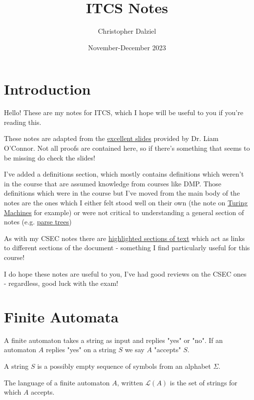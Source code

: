 \documentclass{article}
\title{ITCS Notes}
\author{Christopher Dalziel}
\date{November-December 2023}
\begin{document}
\maketitle

\tableofcontents\label{table-of-contents}

\newpage

\section{Introduction}
Hello! These are my notes for ITCS, which I hope will be useful to you if you're reading this.

These notes are adapted from the \href{https://www.inf.ed.ac.uk/teaching/courses/itcs/lectures.html}{excellent slides} provided by Dr. Liam O'Connor. Not all proofs are contained here, so if there's something that seems to be missing do check the slides!

I've added a definitions section, which mostly contains definitions which weren't in the course that are assumed knowledge from courses like DMP. Those definitions which were in the course but I've moved from the main body of the notes are the ones which I either felt stood well on their own (the note on \hyperref[tm]{Turing Machines} for example) or were not critical to understanding a general section of notes (e.g. \hyperref[parse-trees]{parse trees})

As with my CSEC notes there are \hyperref[table-of-contents]{highlighted sections of text} which act as links to different sections of the document - something I find particularly useful for this course!

I do hope these notes are useful to you, I've had good reviews on the CSEC ones - regardless, good luck with the exam!

\newpage

\section{Finite Automata}\label{finite-automata}
A finite automaton takes a string as input and replies "yes" or "no". If an automaton $A$ replies "yes" on a string $S$ we say $A$ "accepts" $S$.

A string $S$ is a possibly empty sequence of symbols from an alphabet $\Sigma$.

The language of a finite automaton $A$, written $\mathcal{L}(A)$ is the set of strings for which $A$ accepts.
\end{document}
